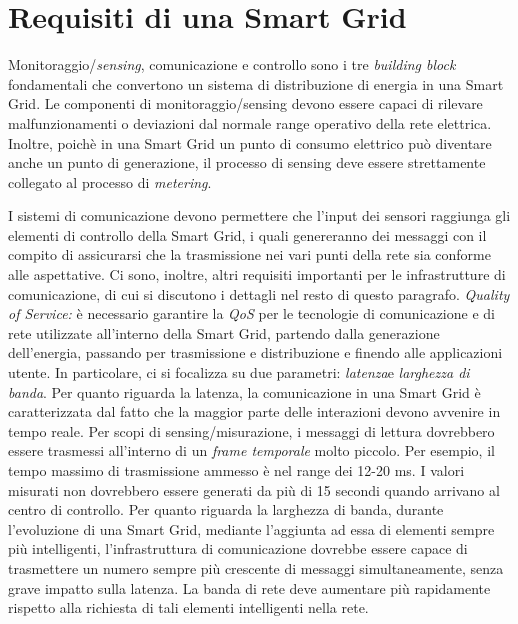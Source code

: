 \section{Requisiti di una Smart Grid}
Monitoraggio/\emph{sensing}, comunicazione e controllo sono i tre \emph{building block} fondamentali che convertono un sistema di distribuzione di energia in una Smart Grid. Le componenti di monitoraggio/sensing devono essere capaci di rilevare malfunzionamenti o deviazioni dal normale range operativo della rete elettrica. Inoltre, poichè in una Smart Grid un punto di consumo elettrico può diventare anche un punto di generazione, il processo di sensing deve essere strettamente collegato al processo di \emph{metering}. \newline

I sistemi di comunicazione devono permettere che l'input dei sensori raggiunga gli elementi di controllo della Smart Grid, i quali genereranno dei messaggi con il compito di assicurarsi che la trasmissione nei vari punti della rete sia conforme alle aspettative. Ci sono, inoltre, altri requisiti importanti per le infrastrutture di comunicazione, di cui si discutono i dettagli nel resto di questo paragrafo.
\newline \newline
\textit{Quality of Service:} è necessario garantire la \emph{QoS} per le tecnologie di comunicazione e di rete utilizzate all'interno della Smart Grid, partendo dalla generazione dell'energia, passando per trasmissione e distribuzione e finendo alle applicazioni utente. In particolare, ci si focalizza su due parametri: \emph{latenza}e \emph{larghezza di banda}.\newline
Per quanto riguarda la latenza, la comunicazione in una Smart Grid è caratterizzata dal fatto che la maggior parte delle interazioni devono avvenire in tempo reale. Per scopi di sensing/misurazione, i messaggi di lettura dovrebbero essere trasmessi all'interno di un \emph{frame temporale} molto piccolo. Per esempio, il tempo massimo di trasmissione ammesso è nel range dei 12-20 ms. I valori misurati non dovrebbero essere generati da più di 15 secondi quando arrivano al centro di controllo. \newline
Per quanto riguarda la larghezza di banda, durante l'evoluzione di una Smart Grid, mediante l'aggiunta ad essa di elementi sempre più intelligenti, l'infrastruttura di comunicazione dovrebbe essere capace di trasmettere un numero sempre più crescente di messaggi simultaneamente, senza grave impatto sulla latenza. La banda di rete deve aumentare più rapidamente rispetto alla richiesta di tali elementi intelligenti nella rete.
